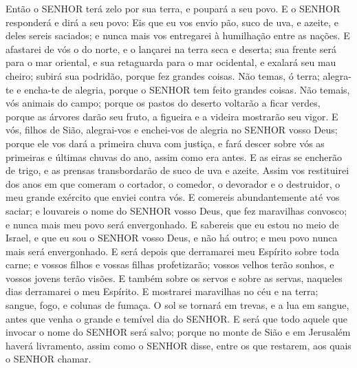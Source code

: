 {Então o SENHOR terá zelo por sua terra, e poupará a seu povo.
E o SENHOR responderá e dirá a seu povo: Eis que eu vos envio pão, suco de uva, e azeite, e deles sereis saciados; e nunca mais vos entregarei à humilhação entre as nações.
E afastarei de vós o
{} do norte, e o lançarei na terra seca e deserta; sua frente será para o mar oriental, e sua retaguarda para o mar ocidental, e exalará seu mau cheiro; subirá sua podridão, porque fez grandes coisas.
Não temas, ó terra; alegra-te e encha-te de alegria, porque o SENHOR tem feito grandes coisas.
Não temais, vós animais do campo; porque os pastos do deserto voltarão a ficar verdes, porque as árvores darão seu fruto, a figueira e a videira mostrarão seu vigor.
E vós, filhos de Sião, alegrai-vos e enchei-vos de alegria no SENHOR vosso Deus; porque ele vos dará a primeira chuva com justiça, e fará descer sobre vós as primeiras e últimas chuvas do ano, assim como era antes.
E as eiras se encherão de trigo, e as prensas transbordarão de suco de uva e azeite.
Assim vos restituirei dos anos em que comeram o cortador, o comedor, o devorador e o destruidor, o meu grande exército que enviei contra vós.
E comereis abundantemente até vos saciar; e louvareis o nome do SENHOR vosso Deus, que fez maravilhas convosco; e nunca mais meu povo será envergonhado.
E sabereis que eu estou no meio de Israel, e que eu sou o SENHOR vosso Deus, e não há outro; e meu povo nunca mais será envergonhado.
E será depois que derramarei meu Espírito sobre toda carne;
 e vossos filhos e vossas filhas profetizarão; vossos velhos terão sonhos, e vossos jovens terão visões.
E também sobre os servos e sobre as servas, naqueles dias derramarei o meu Espírito.
E mostrarei maravilhas no céu e na terra; sangue, fogo, e colunas de fumaça.
O sol se tornará em trevas, e a lua em sangue, antes que venha o grande e temível dia do SENHOR.
E será que todo aquele que invocar o nome do SENHOR será salvo; porque no monte de Sião e em Jerusalém haverá livramento, assim como o SENHOR disse, entre os que restarem, aos quais o SENHOR chamar.

}
